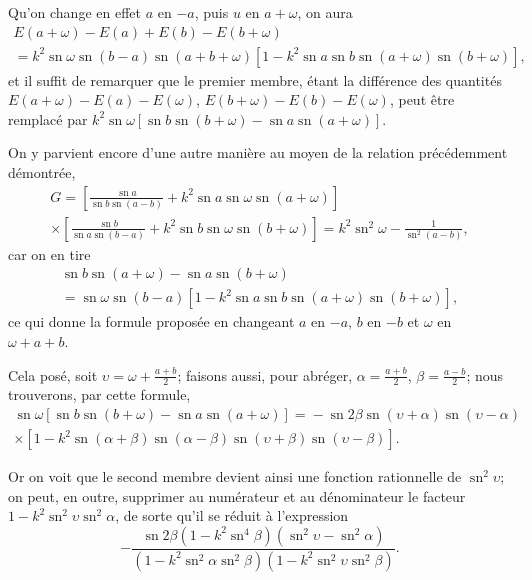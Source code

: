 \documentclass[11pt,leqno,oneside,letterpaper]{book}[2005/09/16]
\DeclareMathOperator{\sn}{sn}
\begin{document}
Qu'on change en effet $a$ en $- a$, puis $u$ en $a + \omega$, on aura
\begin{multline*}
E(a+\omega) - E(a) + E(b) - E(b+\omega) \\
   = k^2 \sn \omega \sn(b-a) \sn(a+b+\omega)
     \left[1 - k^2 \sn a \sn b \sn(a+\omega) \sn(b+\omega) \right],
\end{multline*}
et il suffit de remarquer que le premier membre, \'etant la diff\'erence des
quantit\'es $E(a + \omega) - E(a) - E(\omega)$, $E(b + \omega) - E(b) - E(\omega)$, peut \^etre
remplac\'e par $k^2 \sn \omega \left[\sn b \sn(b + \omega) - \sn a \sn(a + \omega)\right]$.
\medskip

On y parvient encore d'une autre mani\`ere au moyen de la relation
pr\'ec\'edemment d\'emontr\'ee,
\begin{multline*}
G =      \left[ \frac{\sn a}{\sn b \sn(a-b)} + k^2 \sn a \sn \omega \sn(a+\omega) \right] \\
  \times \left[ \frac{\sn b}{\sn a \sn(b-a)} + k^2 \sn b \sn \omega \sn(b+\omega) \right]
   = k^2 \sn^2 \omega - \frac{1}{\sn^2 (a-b)},
\end{multline*}
car on en tire
\begin{multline*}
\sn b \sn(a+\omega) - \sn a \sn(b+\omega) \\
  = \sn \omega \sn(b-a) \left[ 1 - k^2 \sn a \sn b \sn(a+\omega) \sn(b+\omega) \right],
\end{multline*}
ce qui donne la formule propos\'ee en changeant $a$ en $-a$, $b$ en $-b$ et $\omega$
en $\omega + a + b$.

Cela pos\'e, soit $\upsilon=\omega+\frac{a+b}{2}$; faisons aussi, pour abr\'eger, $\alpha=\frac{a+b}{2}$,
$\beta=\frac{a-b}{2}$; nous trouverons, par cette formule,
\begin{multline*}
\sn\omega \left[\sn b\sn(b+\omega)-\sn a\sn(a+\omega) \right] =
{} -\sn 2\beta\sn(\upsilon+\alpha)\sn(\upsilon-\alpha) \\\times
  \left[1-k^2\sn(\alpha+\beta)\sn(\alpha-\beta)\sn(\upsilon+\beta)
      \sn(\upsilon-\beta) \right].
\end{multline*}

Or on voit que le second membre devient ainsi une fonction rationnelle
de $\sn^2\upsilon$; on peut, en outre, supprimer au num\'erateur et au d\'enominateur
le facteur $1-k^2\sn^2\upsilon\sn^2\alpha$, de sorte qu'il se r\'eduit \`a l'expression
\[
-\frac{\sn2\beta(1-k^2\sn^4\beta)(\sn^2\upsilon-\sn^2\alpha)}{
  (1-k^2\sn^2\alpha\sn^2\beta)(1-k^2\sn^2\upsilon\sn^2\beta)}.
\]
\end{document}
